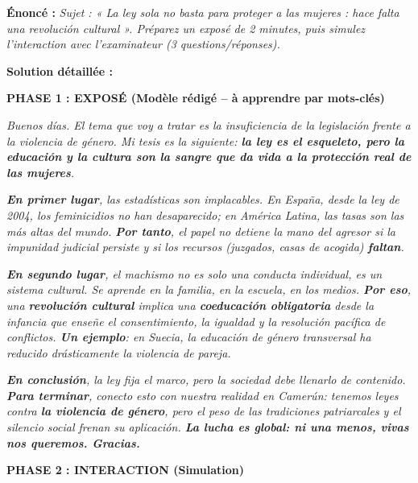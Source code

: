 \documentclass[11pt]{article}
\begin{document}
\begin{exoresolu}
\textbf{Énoncé :} \emph{Sujet : « La ley sola no basta para proteger a las mujeres : hace falta una revolución cultural ». Préparez un exposé de 2 minutes, puis simulez l'interaction avec l'examinateur (3 questions/réponses).}

\tcblower
\textbf{Solution détaillée :}

\textbf{PHASE 1 : EXPOSÉ (Modèle rédigé -- à apprendre par mots-clés)}

\emph{Buenos días. El tema que voy a tratar es la insuficiencia de la legislación frente a la violencia de género. Mi tesis es la siguiente: \textbf{la ley es el esqueleto, pero la educación y la cultura son la sangre que da vida a la protección real de las mujeres}.}

\emph{\textbf{En primer lugar}, las estadísticas son implacables. En España, desde la ley de 2004, los feminicidios no han desaparecido; en América Latina, las tasas son las más altas del mundo. \textbf{Por tanto}, el papel no detiene la mano del agresor si la impunidad judicial persiste y si los recursos (juzgados, casas de acogida) \textbf{faltan}.}

\emph{\textbf{En segundo lugar}, el machismo no es solo una conducta individual, es un sistema cultural. Se aprende en la familia, en la escuela, en los medios. \textbf{Por eso}, una \textbf{revolución cultural} implica una \textbf{coeducación obligatoria} desde la infancia que enseñe el consentimiento, la igualdad y la resolución pacífica de conflictos. \textbf{Un ejemplo}: en Suecia, la educación de género transversal ha reducido drásticamente la violencia de pareja.}

\emph{\textbf{En conclusión}, la ley fija el marco, pero la sociedad debe llenarlo de contenido. \textbf{Para terminar}, conecto esto con nuestra realidad en Camerún: tenemos leyes contra \textbf{la violencia de género}, pero el peso de las tradiciones patriarcales y el silencio social frenan su aplicación. \textbf{La lucha es global: ni una menos, vivas nos queremos. Gracias.}}

\textbf{PHASE 2 : INTERACTION (Simulation)}


\end{exoresolu}
\end{document}
